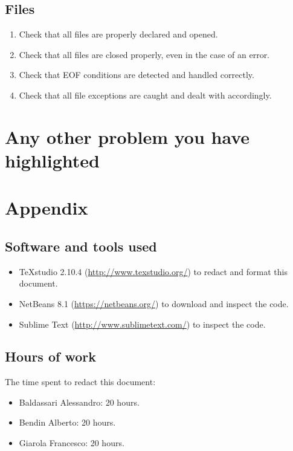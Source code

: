 \documentclass[a4paper,11pt]{report} %
\begin{document}
		\subsection*{Files}\begin{enumerate}[resume]
			\item Check that all files are properly declared and opened.
			\item Check that all files are closed properly, even in the case of an error.
			\item Check that EOF conditions are detected and handled correctly.
			\item Check that all file exceptions are caught and dealt with accordingly.
		\end{enumerate}
		
	
	\section{Any other problem you have highlighted}
	

	\section{Appendix}
	
	\subsection{Software and tools used}
		\begin{itemize}
			\item TeXstudio 2.10.4 (\href{http://www.texstudio.org/}{http://www.texstudio.org/}) to redact and format this document.
			\item NetBeans 8.1 (\href{https://netbeans.org/}{https://netbeans.org/}) to download and inspect the code.
			\item Sublime Text (\href{http://www.sublimetext.com/}{http://www.sublimetext.com/}) to inspect the code.
		\end{itemize}
		
	\subsection{Hours of work} The time spent to redact this document:
		\begin{itemize}
			\item Baldassari Alessandro: 20 hours.
			\item Bendin Alberto: 20 hours.
			\item Giarola Francesco: 20 hours.
		\end{itemize}
\end{document}
